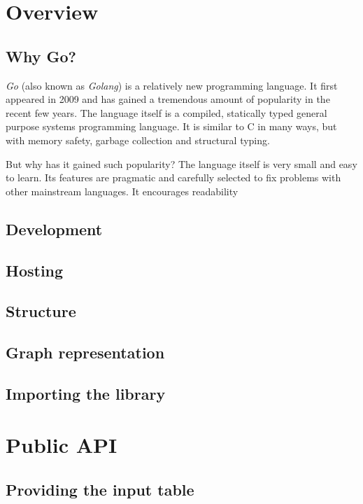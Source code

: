 \section{Overview}

\subsection{Why Go?}

\emph{Go} (also known as \emph{Golang}) is a relatively new programming language. It first appeared in 2009 and has gained a tremendous amount of popularity in the recent few years. \cite{wiki08} The language itself is a compiled, statically typed general purpose systems programming language. It is similar to C in many ways, but with memory safety, garbage collection and structural typing.

But why has it gained such popularity? The language itself is very small and easy to learn. Its features are pragmatic and carefully selected to fix problems with other mainstream languages. It encourages readability


\subsection{Development}

\subsection{Hosting}

\subsection{Structure}

\subsection{Graph representation}

\subsection{Importing the library}

\section{Public API}

\subsection{Providing the input table}

